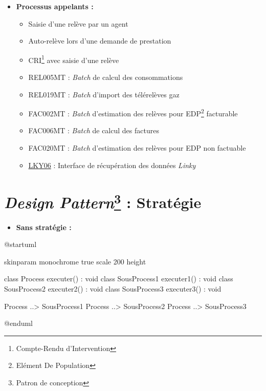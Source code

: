 \documentclass[a4paper, 12pt]{report}
\begin{document}
\begin{itemize}
  \item \textbf{Processus appelants :}\\
  \begin{itemize}
    \item Saisie d'une relève par un agent
    \item Auto-relève lors d'une demande de prestation
    \item CRI\footnote{Compte-Rendu d'Intervention} avec saisie d'une relève
    \item REL005MT : \textit{Batch} de calcul des consommations
    \item REL019MT : \textit{Batch} d'import des télérelèves gaz
    \item FAC002MT : \textit{Batch} d'estimation des relèves pour EDP\footnote{Elément De Population} facturable
    \item FAC006MT : \textit{Batch} de calcul des factures
    \item FAC020MT : \textit{Batch} d'estimation des relèves pour EDP non factuable
    \item \underline{LKY06} : Interface de récupération des données \textit{Linky}
  \end{itemize}
\end{itemize}

\chapter{\textit{Design Pattern}\footnote{Patron de conception} : Stratégie}
\label{appendix:strategy}

\begin{itemize}
  \item \textbf{Sans stratégie :}\\
\end{itemize}

\begin{center}
  \begin{plantuml}
    @startuml

    skinparam monochrome true
    scale 200 height

    class Process {
      executer() : void
    }
    class SousProcess1 {
      executer1() : void
    }
    class SousProcess2 {
      executer2() : void
    }
    class SousProcess3 {
      executer3() : void
    }

    Process ..> SousProcess1
    Process ..> SousProcess2
    Process ..> SousProcess3

    @enduml
  \end{plantuml}
\end{center}
\vspace{0.5cm}
\end{document}
